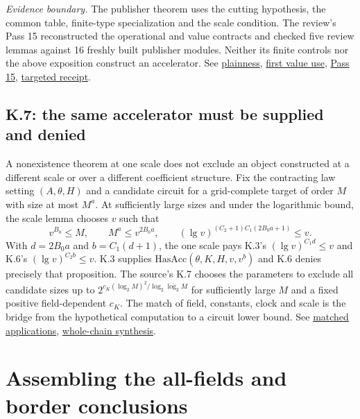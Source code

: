 \documentclass[11pt,letterpaper]{article}
\theoremstyle{definition}\newtheorem{definition}[theorem]{Definition}\newtheorem{example}[theorem]{Example}
\theoremstyle{remark}\newtheorem{remark}[theorem]{Remark}
\newcommand{\pub}[3]{\href{https://github.com/anthropics/formal-math/blob/11b6c7e3c927df2658f513b6b68ea7f8929c62c5/vp-vnp/#1\#L#2}{#3}}
\newcommand{\aud}[2]{\href{https://github.com/nousentllc/VP-VNP-Review/blob/567303d0bcf4f9d54390437b137752446e58ccd6/#1}{#2}}
\newcommand{\scope}[1]{\par\smallskip\noindent\textit{Evidence boundary.} #1\par\smallskip}
\begin{document}
\scope{The publisher theorem uses the cutting hypothesis, the common table, finite-type specialization and the scale condition. The review's Pass 15 reconstructed the operational and value contracts and checked five review lemmas against 16 freshly built publisher modules. Neither its finite controls nor the above exposition construct an accelerator. See \pub{Paper/NoAcc.lean}{188}{plainness}, \pub{Paper/NoAcc.lean}{216}{first value use}, \aud{passes/15-diagonal.md}{Pass 15}, \aud{checks/pass15_lean.json}{targeted receipt}.}

\subsection{K.7: the same accelerator must be supplied and denied}\label{sec:match}
A nonexistence theorem at one scale does not exclude an object constructed at a different scale or over a different coefficient structure. Fix the contracting law setting $(A,\theta,H)$ and a candidate circuit for a grid-complete target of order $M$ with size at most $M^a$. At sufficiently large sizes and under the logarithmic bound, the scale lemma chooses $v$ such that
\[
 v^{B_0}\le M,\qquad M^a\le v^{2B_0a},\qquad
 (\lg v)^{(C_2+1)C_1(2B_0a+1)}\le v.
\]
With $d=2B_0a$ and $b=C_1(d+1)$, the one scale pays K.3's $(\lg v)^{C_1d}\le v$ and K.6's $(\lg v)^{C_2b}\le v$. K.3 supplies $\mathrm{HasAcc}(\theta,K,H,v,v^b)$ and K.6 denies precisely that proposition. The source's K.7 chooses the parameters to exclude all candidate sizes up to $2^{c_K(\log_2M)^2/\log_2\log_2M}$ for sufficiently large $M$ and a fixed positive field-dependent $c_K$. The match of field, constants, clock and scale is the bridge from the hypothetical computation to a circuit lower bound. See \pub{Paper/Scales.lean}{141}{matched applications}, \aud{passes/14e-circuit-to-contradiction.md}{whole-chain synthesis}.

\section{Assembling the all-fields and border conclusions}\label{sec:assembly}
\end{document}
